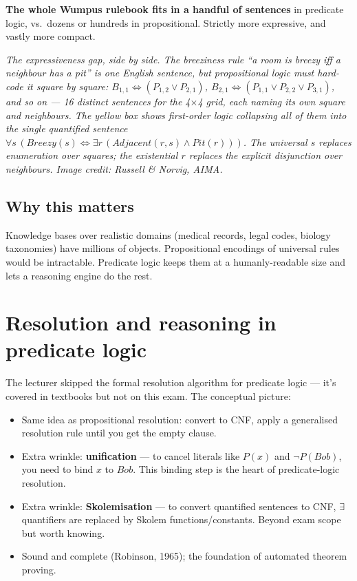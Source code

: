 \documentclass[11pt, a4paper]{article}
\begin{document}
\textbf{The whole Wumpus rulebook fits in a handful of sentences} in predicate logic, vs.\ dozens or hundreds in propositional. Strictly more expressive, and vastly more compact.

\begin{center}

\footnotesize\textit{The expressiveness gap, side by side. The breeziness rule ``a room is breezy iff a neighbour has a pit'' is one English sentence, but propositional logic must hard-code it square by square: $B_{1,1}\Leftrightarrow(P_{1,2}\lor P_{2,1})$, $B_{2,1}\Leftrightarrow(P_{1,1}\lor P_{2,2}\lor P_{3,1})$, and so on — 16 distinct sentences for the 4$\times$4 grid, each naming its own square and neighbours. The yellow box shows first-order logic collapsing all of them into the single quantified sentence $\forall s\,(Breezy(s)\Leftrightarrow\exists r\,(Adjacent(r,s)\land Pit(r)))$. The universal $s$ replaces enumeration over squares; the existential $r$ replaces the explicit disjunction over neighbours. Image credit: Russell \& Norvig, AIMA.}
\end{center}

\subsection{Why this matters}

Knowledge bases over realistic domains (medical records, legal codes, biology taxonomies) have millions of objects. Propositional encodings of universal rules would be intractable. Predicate logic keeps them at a humanly-readable size and lets a reasoning engine do the rest.

\section{Resolution and reasoning in predicate logic}

The lecturer skipped the formal resolution algorithm for predicate logic — it's covered in textbooks but not on this exam. The conceptual picture:

\begin{itemize}
  \item Same idea as propositional resolution: convert to CNF, apply a generalised resolution rule until you get the empty clause.
  \item Extra wrinkle: \textbf{unification} — to cancel literals like $P(x)$ and $\neg P(Bob)$, you need to bind $x$ to $Bob$. This binding step is the heart of predicate-logic resolution.
  \item Extra wrinkle: \textbf{Skolemisation} — to convert quantified sentences to CNF, $\exists$ quantifiers are replaced by Skolem functions/constants. Beyond exam scope but worth knowing.
  \item Sound and complete (Robinson, 1965); the foundation of automated theorem proving.
\end{itemize}
\end{document}
